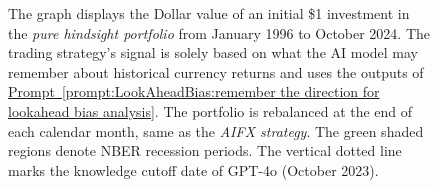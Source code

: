 \documentclass[12pt,oneside,letter]{article}
\newcommand*{\myprp}[1]{\hyperref[{#1}]{Prompt~\ref*{#1}}}
\begin{document}
\begin{appendices}
\begin{landscape}
\begin{figure}
\begin{center}
{
}
		    \medskip
		     \label{fig:LookAheadBias:pure hindsight performance over time}
	    \end{center}
	
	
	    \begin{small}
	    The graph displays the Dollar value of an initial \$1 investment in the \textit{pure hindsight portfolio} from January 1996 to October 2024. The trading strategy’s signal is solely based on what the AI model may remember about historical currency returns and uses the outputs of \myprp{prompt:LookAheadBias:remember the direction for lookahead bias analysis}. The portfolio is rebalanced at the end of each calendar month, same as the \textit{AIFX strategy}. The green shaded regions denote NBER recession periods. The vertical dotted line marks the knowledge cutoff date of GPT-4o (October 2023).
	    \end{small}


	\end{figure}

\end{landscape}



		\begin{landscape}
	
	\begin{figure}


\end{figure}
\end{landscape}
\end{appendices}
\end{document}
